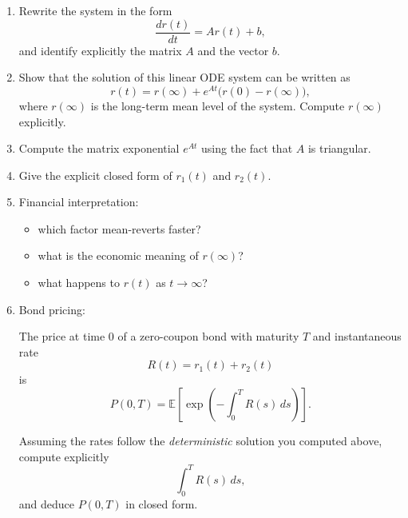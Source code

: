 \documentclass[11pt]{article}
\begin{document}
\begin{enumerate}

\item Rewrite the system in the form
\[
\frac{dr(t)}{dt} = A r(t) + b,
\]
and identify explicitly the matrix $A$ and the vector $b$.

\item Show that the solution of this linear ODE system can be written as
\[
r(t)= r(\infty) + e^{At}\bigl(r(0)-r(\infty)\bigr),
\]
where $r(\infty)$ is the long-term mean level of the system.  
Compute $r(\infty)$ explicitly.

\item Compute the matrix exponential $e^{At}$ using the fact that $A$ is triangular.

\item Give the explicit closed form of $r_1(t)$ and $r_2(t)$.

\item Financial interpretation:
\begin{itemize}
\item which factor mean-reverts faster?
\item what is the economic meaning of $r(\infty)$?
\item what happens to $r(t)$ as $t\to\infty$?
\end{itemize}

\item Bond pricing:

The price at time $0$ of a zero-coupon bond with maturity $T$ and instantaneous rate
\[
R(t)=r_1(t)+r_2(t)
\]
is
\[
P(0,T)=
\mathbb{E}\left[
\exp\left(-\int_0^T R(s)\,ds\right)
\right].
\]

Assuming the rates follow the \emph{deterministic} solution you computed above, compute explicitly
\[
\int_0^T R(s)\,ds,
\]
and deduce $P(0,T)$ in closed form.

\end{enumerate}
\end{document}
